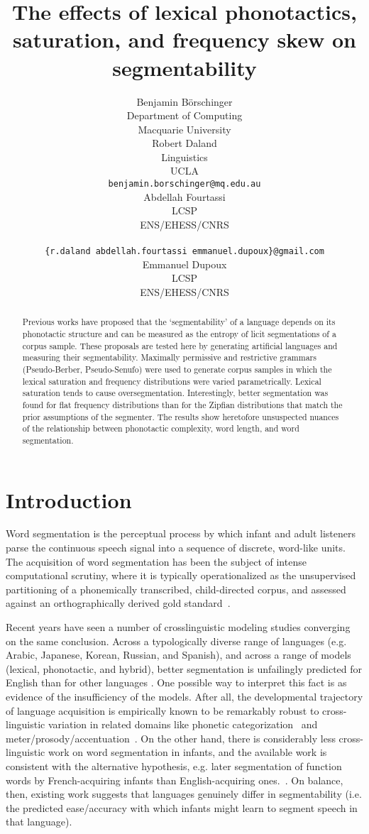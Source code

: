 \documentclass[11pt]{article}
\title{The effects of lexical phonotactics, saturation,
  and frequency skew on segmentability}
\author{Benjamin B{\"o}rschinger \\
    Department of Computing \\
    Macquarie University \\\And
  Robert Daland \\
    Linguistics \\
    UCLA \\
    {\tt benjamin.borschinger@mq.edu.au} \\\And
  Abdellah Fourtassi \\
    LCSP \\
    ENS/EHESS/CNRS \\
    \\
    {\tt \{r.daland\,abdellah.fourtassi\,emmanuel.dupoux\}@gmail.com} \\\And
  Emmanuel Dupoux \\
    LCSP \\
    ENS/EHESS/CNRS }
\date{}
\begin{document}
\maketitle
\begin{abstract}
  Previous works have proposed that the `segmentability' of a language
  depends on its phonotactic structure and can be measured as the
  entropy of licit segmentations of a corpus sample. These proposals
  are tested here by generating artificial languages and measuring
  their segmentability. Maximally permissive and restrictive grammars
  (Pseudo-Berber, Pseudo-Senufo) were used to generate corpus samples 
  in which the lexical saturation and frequency distributions were
  varied parametrically. Lexical saturation tends to cause oversegmentation.
  Interestingly, better segmentation was found for flat frequency
  distributions than for the Zipfian distributions that match the
  prior assumptions of the segmenter. The results show heretofore
  unsuspected nuances of the relationship between phonotactic complexity,
  word length, and word segmentation.
\end{abstract}


\section{Introduction}

Word segmentation is the perceptual process by which infant and adult listeners parse the continuous speech signal into a sequence of discrete, word-like units. The acquisition of word segmentation has been the subject of intense computational scrutiny, where it is typically operationalized as the unsupervised partitioning of a phonemically transcribed, child-directed corpus, and assessed against an orthographically derived gold standard~\cite{GGJ09,DP11,PearlEtAl11}.

Recent years have seen a number of crosslinguistic modeling studies converging on the same conclusion. Across a typologically diverse range of languages (e.g. Arabic, Japanese, Korean, Russian, and Spanish), and across a range of models (lexical, phonotactic, and hybrid), better segmentation is unfailingly predicted for English than for other languages \cite{Fleck08,Daland09,DP11,FourtassiEtAl13,DalandZuraw13}. One possible way to interpret this fact is as evidence of the insufficiency of the models. After all, the developmental trajectory of language acquisition is empirically known to be remarkably robust to cross-linguistic variation in related domains like phonetic categorization~\cite{ref} and meter/prosody/accentuation~\cite{ref}. On the other hand, there is considerably less cross-linguistic work on word segmentation in infants, and the available work is consistent with the alternative hypothesis, e.g. later segmentation of function words by French-acquiring infants than English-acquiring ones.~\cite{ref}. On balance, then, existing work suggests that languages genuinely differ in segmentability (i.e. the predicted ease/accuracy with which infants might learn to segment speech in that language).
\end{document}
